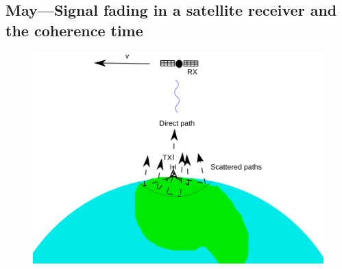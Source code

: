 \documentclass{article}
\begin{document}
\subsection{May---Signal fading in a satellite receiver and the coherence time}
\begin{figure}
  \includegraphics[width=\linewidth]{satelliteinterference.png}
\end{figure}
\end{document}
